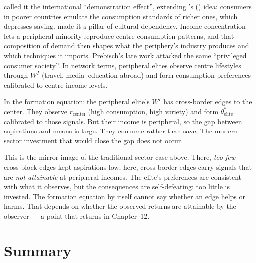 \documentclass[../structural_economics_book.tex]{subfiles}
\begin{document}
\begin{prebisch}
\citet{nurkse1953problems} called it the international ``demonstration effect'', extending \citeauthor{duesenberry1949income}'s (\citeyear{duesenberry1949income}) idea: consumers in poorer countries emulate the consumption standards of richer ones, which depresses saving. \citet{furtado1974mito} made it a pillar of cultural dependency. Income concentration lets a peripheral minority reproduce centre consumption patterns, and that composition of demand then shapes what the periphery's industry produces and which techniques it imports. Prebisch's late work \citep{prebisch1981capitalismo} attacked the same ``privileged consumer society''.
In network terms, peripheral elites observe centre lifestyles through $W^I$ (travel, media, education abroad) and form consumption preferences calibrated to centre income levels.

In the formation equation: the peripheral elite's $W^I$ has cross-border edges to the center. They observe $r_{\text{center}}$ (high consumption, high variety) and form $\theta^*_{\text{elite}}$ calibrated to those signals. But their income is peripheral, so the gap between aspirations and means is large. They consume rather than save. The modern-sector investment that would close the gap does not occur.

This is the mirror image of the traditional-sector case above. There, \textit{too few} cross-block edges kept aspirations low; here, cross-border edges carry signals that are \textit{not attainable} at peripheral incomes. The elite's preferences are consistent with what it observes, but the consequences are self-defeating: too little is invested. The formation equation by itself cannot say whether an edge helps or harms. That depends on whether the observed returns are attainable by the observer --- a point that returns in Chapter~12.
\end{prebisch}


\section{Summary}
\label{ch09:sec:summary}
\end{document}
